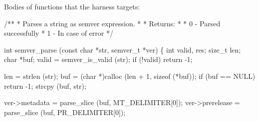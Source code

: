\documentclass[
  a4paper,
]{scrreprt}
\newenvironment{Shaded}{\begin{snugshade}}{\end{snugshade}}
\newcommand{\CommentTok}[1]{\textcolor[rgb]{0.41,0.41,0.41}{#1}}
\newcommand{\ControlFlowTok}[1]{\textcolor[rgb]{0.85,0.12,0.09}{#1}}
\newcommand{\DataTypeTok}[1]{\textcolor[rgb]{0.47,0.16,0.63}{#1}}
\newcommand{\DecValTok}[1]{\textcolor[rgb]{0.47,0.16,0.63}{#1}}
\newcommand{\KeywordTok}[1]{\textcolor[rgb]{0.85,0.12,0.09}{#1}}
\newcommand{\NormalTok}[1]{\textcolor[rgb]{0.33,0.33,0.33}{#1}}
\newcommand{\OperatorTok}[1]{\textcolor[rgb]{0.00,0.46,0.62}{#1}}
\theoremstyle{definition}
\theoremstyle{remark}
\begin{document}
Bodies of functions that the harness targets:

\begin{Shaded}
\begin{Highlighting}[numbers=left,,]
\CommentTok{/**}
\CommentTok{ * Parses a string as semver expression.}
\CommentTok{ *}
\CommentTok{ * Returns:}
\CommentTok{ *}
\CommentTok{ * \textasciigrave{}0\textasciigrave{} {-} Parsed successfully}
\CommentTok{ * \textasciigrave{}{-}1\textasciigrave{} {-} In case of error}
\CommentTok{ */}

\DataTypeTok{int}
\NormalTok{semver\_parse }\OperatorTok{(}\DataTypeTok{const} \DataTypeTok{char} \OperatorTok{*}\NormalTok{str}\OperatorTok{,}\NormalTok{ semver\_t }\OperatorTok{*}\NormalTok{ver}\OperatorTok{)}
\OperatorTok{\{}
  \DataTypeTok{int}\NormalTok{ valid}\OperatorTok{,}\NormalTok{ res}\OperatorTok{;}
  \DataTypeTok{size\_t}\NormalTok{ len}\OperatorTok{;}
  \DataTypeTok{char} \OperatorTok{*}\NormalTok{buf}\OperatorTok{;}
\NormalTok{  valid }\OperatorTok{=}\NormalTok{ semver\_is\_valid }\OperatorTok{(}\NormalTok{str}\OperatorTok{);}
  \ControlFlowTok{if} \OperatorTok{(!}\NormalTok{valid}\OperatorTok{)}
    \ControlFlowTok{return} \OperatorTok{{-}}\DecValTok{1}\OperatorTok{;}

\NormalTok{  len }\OperatorTok{=}\NormalTok{ strlen }\OperatorTok{(}\NormalTok{str}\OperatorTok{);}
\NormalTok{  buf }\OperatorTok{=} \OperatorTok{(}\DataTypeTok{char} \OperatorTok{*)}\NormalTok{calloc }\OperatorTok{(}\NormalTok{len }\OperatorTok{+} \DecValTok{1}\OperatorTok{,} \KeywordTok{sizeof} \OperatorTok{(*}\NormalTok{buf}\OperatorTok{));}
  \ControlFlowTok{if} \OperatorTok{(}\NormalTok{buf }\OperatorTok{==}\NormalTok{ NULL}\OperatorTok{)}
    \ControlFlowTok{return} \OperatorTok{{-}}\DecValTok{1}\OperatorTok{;}
\NormalTok{  strcpy }\OperatorTok{(}\NormalTok{buf}\OperatorTok{,}\NormalTok{ str}\OperatorTok{);}

\NormalTok{  ver}\OperatorTok{{-}\textgreater{}}\NormalTok{metadata }\OperatorTok{=}\NormalTok{ parse\_slice }\OperatorTok{(}\NormalTok{buf}\OperatorTok{,}\NormalTok{ MT\_DELIMITER}\OperatorTok{[}\DecValTok{0}\OperatorTok{]);}
\NormalTok{  ver}\OperatorTok{{-}\textgreater{}}\NormalTok{prerelease }\OperatorTok{=}\NormalTok{ parse\_slice }\OperatorTok{(}\NormalTok{buf}\OperatorTok{,}\NormalTok{ PR\_DELIMITER}\OperatorTok{[}\DecValTok{0}\OperatorTok{]);}


\end{Highlighting}
\end{Shaded}
\end{document}
